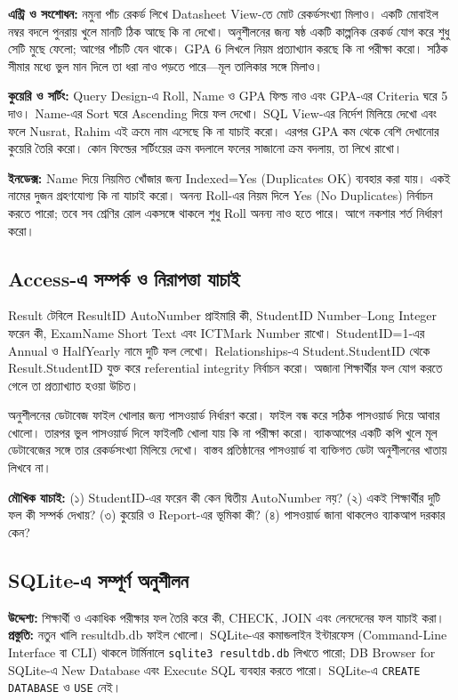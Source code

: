 \textbf{এন্ট্রি ও সংশোধন:} নমুনা পাঁচ রেকর্ড লিখে Datasheet View-তে মোট রেকর্ডসংখ্যা মিলাও। একটি মোবাইল নম্বর বদলে পুনরায় খুলে মানটি ঠিক আছে কি না দেখো। অনুশীলনের জন্য ষষ্ঠ একটি কাল্পনিক রেকর্ড যোগ করে শুধু সেটি মুছে ফেলো; আগের পাঁচটি যেন থাকে। GPA 6 লিখলে নিয়ম প্রত্যাখ্যান করছে কি না পরীক্ষা করো। সঠিক সীমার মধ্যে ভুল মান দিলে তা ধরা নাও পড়তে পারে---মূল তালিকার সঙ্গে মিলাও।

\textbf{কুয়েরি ও সর্টিং:} Query Design-এ Roll, Name ও GPA ফিল্ড নাও এবং GPA-এর Criteria ঘরে 5 দাও। Name-এর Sort ঘরে Ascending দিয়ে ফল দেখো। SQL View-এর নির্দেশ মিলিয়ে দেখো এবং ফলে Nusrat, Rahim এই ক্রমে নাম এসেছে কি না যাচাই করো। এরপর GPA কম থেকে বেশি দেখানোর কুয়েরি তৈরি করো। কোন ফিল্ডের সর্টিংয়ের ক্রম বদলালে ফলের সাজানো ক্রম বদলায়, তা লিখে রাখো।

\textbf{ইনডেক্স:} Name দিয়ে নিয়মিত খোঁজার জন্য Indexed=Yes (Duplicates OK) ব্যবহার করা যায়। একই নামের দুজন গ্রহণযোগ্য কি না যাচাই করো। অনন্য Roll-এর নিয়ম দিলে Yes (No Duplicates) নির্বাচন করতে পারো; তবে সব শ্রেণির রোল একসঙ্গে থাকলে শুধু Roll অনন্য নাও হতে পারে। আগে নকশার শর্ত নির্ধারণ করো।

\subsection{Access-এ সম্পর্ক ও নিরাপত্তা যাচাই}
Result টেবিলে ResultID AutoNumber প্রাইমারি কী, StudentID Number--Long Integer ফরেন কী, ExamName Short Text এবং ICTMark Number রাখো। StudentID=1-এর Annual ও HalfYearly নামে দুটি ফল লেখো। Relationships-এ Student.StudentID থেকে Result.StudentID যুক্ত করে referential integrity নির্বাচন করো। অজানা শিক্ষার্থীর ফল যোগ করতে গেলে তা প্রত্যাখ্যাত হওয়া উচিত।

অনুশীলনের ডেটাবেজ ফাইল খোলার জন্য পাসওয়ার্ড নির্ধারণ করো। ফাইল বন্ধ করে সঠিক পাসওয়ার্ড দিয়ে আবার খোলো। তারপর ভুল পাসওয়ার্ড দিলে ফাইলটি খোলা যায় কি না পরীক্ষা করো। ব্যাকআপের একটি কপি খুলে মূল ডেটাবেজের সঙ্গে তার রেকর্ডসংখ্যা মিলিয়ে দেখো। বাস্তব প্রতিষ্ঠানের পাসওয়ার্ড বা ব্যক্তিগত ডেটা অনুশীলনের খাতায় লিখবে না।

\textbf{মৌখিক যাচাই:} (১) StudentID-এর ফরেন কী কেন দ্বিতীয় AutoNumber নয়? (২) একই শিক্ষার্থীর দুটি ফল কী সম্পর্ক দেখায়? (৩) কুয়েরি ও Report-এর ভূমিকা কী? (৪) পাসওয়ার্ড জানা থাকলেও ব্যাকআপ দরকার কেন?


\subsection{SQLite-এ সম্পূর্ণ অনুশীলন}
\textbf{উদ্দেশ্য:} শিক্ষার্থী ও একাধিক পরীক্ষার ফল তৈরি করে কী, CHECK, JOIN এবং লেনদেনের ফল যাচাই করা।
\textbf{প্রস্তুতি:} নতুন খালি resultdb.db ফাইল খোলো। SQLite-এর কমান্ডলাইন ইন্টারফেস (Command-Line Interface বা CLI) থাকলে টার্মিনালে \texttt{sqlite3 resultdb.db} লিখতে পারো; DB Browser for SQLite-এ New Database এবং Execute SQL ব্যবহার করতে পারো। SQLite-এ \texttt{CREATE DATABASE} ও \texttt{USE} নেই।

